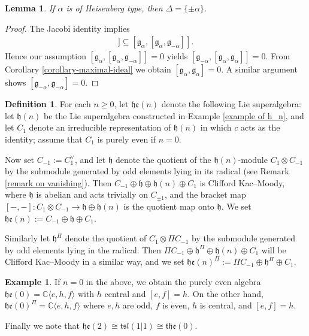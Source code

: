 \documentclass[12pt, a4paper, reqno]{amsart}
\def\C{\mathbb{C}}
\def\e{\mathfrak{e}}
\def\h{\mathfrak{h}}
\def\l{\mathfrak{l}}
\def\s{\mathfrak{s}}
\newtheorem{lemma}{Lemma}
\theoremstyle{definition}
\newtheorem{definition}{Definition}
\theoremstyle{definition}
\theoremstyle{definition}
\newtheorem{example}{Example}}
\numberwithin{theorem}{section}
\numberwithin{lemma}{section}
\numberwithin{remark}{section}
\numberwithin{definition}{section}
\numberwithin{corollary}{section}
\numberwithin{proposition}{section}
\numberwithin{example}{section}
\begin{document}
	\begin{lemma}
		If $\alpha$ is of Heisenberg type, then \(\Delta = \{\pm \alpha\}\).
	\end{lemma}
	\begin{proof}
		The Jacobi identity implies
		\begin{align*}
			[\mathfrak{g}_{-\alpha},[\mathfrak{g}_{\alpha},\mathfrak{g}_{\alpha}]] \subseteq [\mathfrak{g}_{\alpha},[\mathfrak{g}_{\alpha},\mathfrak{g}_{-\alpha}]].
		\end{align*}
		Hence our assumption \([\mathfrak{g}_{\alpha},[\mathfrak{g}_{\alpha},\mathfrak{g}_{-\alpha}]] = 0\) yields \([\mathfrak{g}_{-\alpha},[\mathfrak{g}_{\alpha},\mathfrak{g}_{\alpha}]] = 0\). From Corollary \ref{corollary-maximal-ideal} we obtain \([\mathfrak{g}_{\alpha},\mathfrak{g}_{\alpha}] = 0\). A similar argument shows \([\mathfrak{g}_{-\alpha},\mathfrak{g}_{-\alpha}] = 0\).
	\end{proof}
	
	\begin{definition}\label{definition he_n}
		For each  $n\geq0$, let $\h\e(n)$ denote the following Lie superalgebra: let $\h(n)$ be the Lie superalgebra constructed in Example \ref{example of h_n}, and let $C_1$ denote an irreducible representation of $\h(n)$ in which $c$ acts as the identity; assume that $C_1$ is purely even if $n=0$.  
		
		Now set $C_{-1}:=C_1^\vee$, and let $\h$ denote the quotient of the $\h(n)$-module $C_1\otimes C_{-1}$ by the submodule generated by odd elements lying in its radical (see Remark \ref{remark on vanishing}).  Then $C_{-1}\oplus \h\oplus\h(n)\oplus C_1$ is Clifford Kac--Moody, where $\h$ is abelian and acts trivially on $C_{\pm1}$, and the bracket map $[-,-]:C_{1}\otimes C_{-1}\to\h\oplus \h(n)$ is the quotient map onto $\h$.  We set $\h\e(n):=C_{-1}\oplus\h\oplus C_1$.  
		
		Similarly let $\h^{\Pi}$ denote the quotient of $C_{1}\otimes\Pi C_{-1}$ by the submodule generated by odd elements lying in the radical.  Then $\Pi C_{-1}\oplus\h^{\Pi}\oplus\h(n)\oplus C_1$ will be Clifford Kac--Moody in a similar way, and we set $\h\e(n)^{\Pi}:=\Pi C_{-1}\oplus \h^{\Pi}\oplus C_1$.
	\end{definition}
	\begin{example}\label{example_he(n)}
		If $n=0$ in the above, we obtain the purely even algebra $\h\e(0)=\C\langle e,h,f\rangle$ with $h$ central and $[e,f]=h$.  On the other hand, $\h\e(0)^{\Pi}=\C\langle e,h,f\rangle$ where $e,h$ are odd, $f$ is even, $h$ is central, and $[e,f]=h$.
		
		Finally we note that $\h\e(2)\cong\mathfrak{t}\s\l(1|1)\cong\mathfrak{t}\h\e(0)$.
	\end{example}
	
\end{document}
